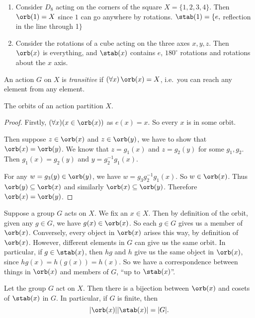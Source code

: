 \documentclass[a4paper]{article}
\begin{document}
\begin{eg}\leavevmode
  \begin{enumerate}
    \item Consider $D_8$ acting on the corners of the square $X = \{1, 2, 3, 4\}$. Then $\orb(1) = X$ since $1$ can go anywhere by rotations. $\stab(1) = \{e, $ reflection in the line through 1$\}$
    \item Consider the rotations of a cube acting on the three axes $x, y, z$. Then $\orb(x)$ is everything, and $\stab(x)$ contains $e$, $180^\circ$ rotations and rotations about the $x$ axis.
  \end{enumerate}
\end{eg}

\begin{defi}
  An action $G$ on $X$ is \emph{transitive} if $(\forall x)\,\orb(x) = X$, i.e.\ you can reach any element from any element.
\end{defi}

\begin{lemma}
  The orbits of an action partition $X$.
\end{lemma}

\begin{proof}
  Firstly, $(\forall x)(x\in \orb (x))$ as $e(x) = x$. So every $x$ is in some orbit.

  Then suppose $z\in \orb (x)$ and $z\in \orb (y)$, we have to show that $\orb(x) = \orb (y)$. We know that $z = g_1(x)$ and $z = g_2(y)$ for some $g_1, g_2$. Then $g_1(x) = g_2(y)$ and $y = g_2^{-1}g_1(x)$.

  For any $w = g_3(y)\in \orb (y)$, we have $w = g_3g_2^{-1}g_1(x)$. So $w\in \orb (x)$. Thus $\orb (y) \subseteq \orb (x)$ and similarly $\orb (x) \subseteq \orb (y)$. Therefore $\orb (x) = \orb (y)$.
\end{proof}

Suppose a group $G$ acts on $X$. We fix an $x \in X$. Then by definition of the orbit, given any $g \in G$, we have $g(x) \in \orb(x)$. So each $g \in G$ gives us a member of $\orb(x)$. Conversely, every object in $\orb(x)$ arises this way, by definition of $\orb(x)$. However, different elements in $G$ can give us the same orbit. In particular, if $g \in \stab(x)$, then $hg$ and $h$ give us the same object in $\orb(x)$, since $hg(x) = h(g(x)) = h(x)$. So we have a correspondence between things in $\orb(x)$ and members of $G$, ``up to $\stab (x)$''.

\begin{thm}
  Let the group $G$ act on $X$. Then there is a bijection between $\orb(x)$ and cosets of $\stab(x)$ in $G$. In particular, if $G$ is finite, then
  \[
    |\orb(x)||\stab(x)| = |G|.
  \]
\end{thm}
\end{document}
